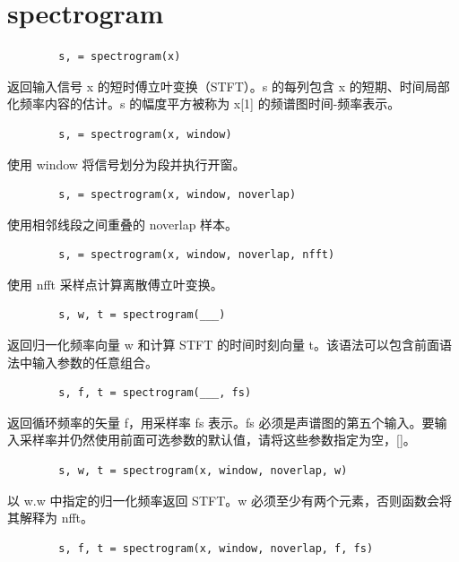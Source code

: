 \documentclass{article}
\begin{document}
	\section*{spectrogram}
	
	\begin{verbatim}
		s, = spectrogram(x)
	\end{verbatim}
	
	返回输入信号 x 的短时傅立叶变换（STFT）。s 的每列包含 x 的短期、时间局部化频率内容的估计。s 的幅度平方被称为 x[1] 的频谱图时间-频率表示。

	\begin{verbatim}
		s, = spectrogram(x, window)
	\end{verbatim}
	
	使用 window 将信号划分为段并执行开窗。
	
	\begin{verbatim}
		s, = spectrogram(x, window, noverlap)
	\end{verbatim}
	
	使用相邻线段之间重叠的 noverlap 样本。
	
	\begin{verbatim}
		s, = spectrogram(x, window, noverlap, nfft)
	\end{verbatim}
	
	使用 nfft 采样点计算离散傅立叶变换。

	\begin{verbatim}
		s, w, t = spectrogram(___)
	\end{verbatim}
	
	返回归一化频率向量 w 和计算 STFT 的时间时刻向量 t。该语法可以包含前面语法中输入参数的任意组合。
	
	\begin{verbatim}
		s, f, t = spectrogram(___, fs)
	\end{verbatim}
	
	返回循环频率的矢量 f，用采样率 fs 表示。fs 必须是声谱图的第五个输入。要输入采样率并仍然使用前面可选参数的默认值，请将这些参数指定为空，[]。
	
	\begin{verbatim}
		s, w, t = spectrogram(x, window, noverlap, w)
	\end{verbatim}
	
	以 w.w 中指定的归一化频率返回 STFT。w 必须至少有两个元素，否则函数会将其解释为 nfft。
	
	\begin{verbatim}
		s, f, t = spectrogram(x, window, noverlap, f, fs)
	\end{verbatim}
	
\end{document}
